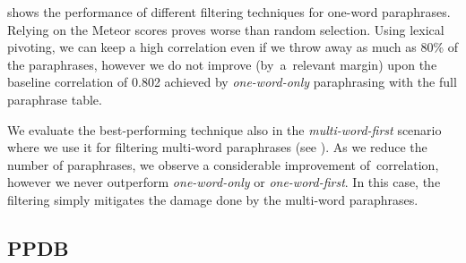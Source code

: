  shows the performance of different filtering techniques for one-word paraphrases. 
Relying on the Meteor scores proves worse than random selection. 
Using lexical pivoting, we can keep a high correlation even if we throw away as much as 80\% of the paraphrases, however we do not improve (by~a~relevant margin) upon the baseline correlation of 0.802 achieved by \emph{one-word-only} paraphrasing with the full paraphrase table.

We evaluate the best-performing technique also in the  \emph{multi-word-first} scenario where we use it for filtering multi-word paraphrases (see ). 
As we reduce the number of paraphrases, we observe a considerable improvement of~correlation, however we never outperform \textit{one-word-only} or \textit{one-word-first}. 
In this case, the filtering simply mitigates the damage done by the multi-word paraphrases. 


\subsection{PPDB} 
